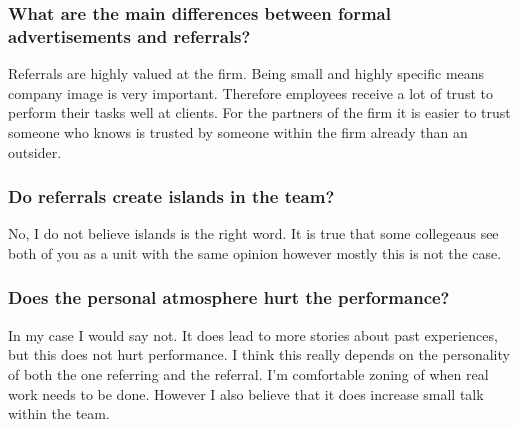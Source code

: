 \documentclass[Main.tex]{subfiles}
\begin{document}
\subsubsection*{What are the main differences between formal advertisements and referrals?}

Referrals are highly valued at the firm. Being small and highly specific means company image is very important. Therefore employees receive a lot of trust to perform their tasks well at clients. For the partners of the firm it is easier to trust someone who knows is trusted by someone within the firm already than an outsider. 

\subsubsection*{Do referrals create islands in the team?}

No, I do not believe islands is the right word. It is true that some collegeaus see both of you as a unit with the same opinion however mostly this is not the case. 

\subsubsection*{Does the personal atmosphere hurt the performance?}

In my case I would say not. It does lead to more stories about past experiences, but this does not hurt performance. I think this really depends on the personality of both the one referring and the referral. I'm comfortable zoning of when real work needs to be done. However I also believe that it does increase small talk within the team. 
\end{document}
